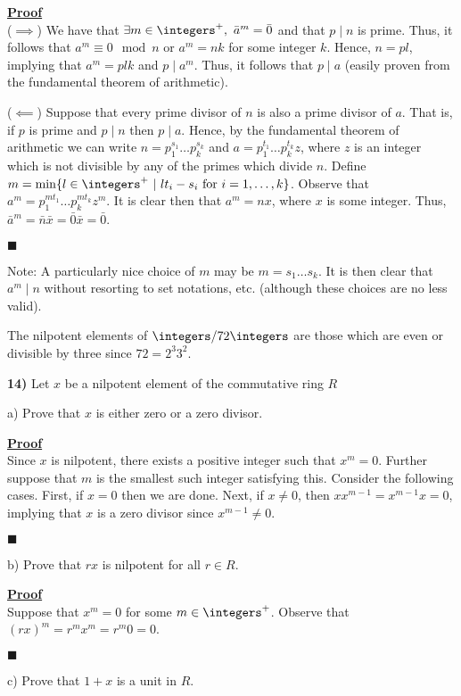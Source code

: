 \documentclass[12pt,a4paper]{article}
\newcommand{\prob}[2]{\textbf{#1)} #2}
\newenvironment{proof}
{
\textbf{\underline{Proof}} \\
}
{
\begin{flushright}
$\blacksquare$
\end{flushright}}
\begin{document}
\begin{proof}
($\implies$) We have that $\exists m \in \integers^+, ~ \bar{a}^m = \bar{0}$ and that $p \mid n$ is prime. Thus, it follows that $a^m \equiv 0 \mod{n}$ or $a^m = nk$ for some integer $k$. Hence, $n = pl$, implying that $a^m = plk$ and $p \mid a^m$. Thus, it follows that $p \mid a$ (easily proven from the fundamental theorem of arithmetic). 

($\impliedby$) Suppose that every prime divisor of $n$ is also a prime divisor of $a$. That is, if $p$ is prime and $p \mid n$ then $p \mid a$. Hence, by the fundamental theorem of arithmetic we can write $n = p_1^{s_1} \hdots p_k^{s_k}$ and $a = p_1^{t_1} \hdots p_k^{t_k}z$, where $z$ is an integer which is not divisible by any of the primes which divide $n$. Define $m = \min\{l \in \integers^+ ~ | ~ lt_i - s_i \text{ for } i = 1,\hdots,k\}$. Observe that $a^m = p_1^{mt_1} \hdots p_k^{mt_k}z^m$. It is clear then that $a^m = nx$, where $x$ is some integer. Thus, $\bar{a}^m = \bar{n}\bar{x} = \bar{0}\bar{x} = \bar{0}$.
\end{proof}

Note: A particularly nice choice of $m$ may be $m = s_1 \hdots s_k$. It is then clear that $a^m \mid n$ without resorting to set notations, etc. (although these choices are no less valid).

The nilpotent elements of $\integers/72\integers$ are those which are even or divisible by three since $72 = 2^3 3^2$.

\prob{14}{Let $x$ be a nilpotent element of the commutative ring $R$}

a) Prove that $x$ is either zero or a zero divisor.

\begin{proof}
Since $x$ is nilpotent, there exists a positive integer such that $x^m = 0$. Further suppose that $m$ is the smallest such integer satisfying this. Consider the following cases. First, if $x = 0$ then we are done. Next, if $x \not = 0$, then $xx^{m-1} = x^{m-1}x = 0$, implying that $x$ is a zero divisor since $x^{m-1} \not= 0$.
\end{proof}

b) Prove that $rx$ is nilpotent for all $r \in R$.

\begin{proof}
Suppose that $x^m = 0$ for some $m \in \integers^{+}$. Observe that $(rx)^m = r^mx^m = r^m0 = 0$.
\end{proof}

c) Prove that $1 + x$ is a unit in $R$.
\end{document}
